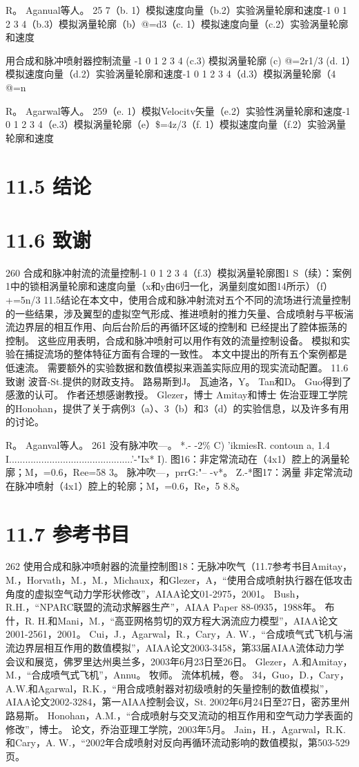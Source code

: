 \documentclass[UTF8,11pt,a4paper,openany,fontset=fandol]{ctexbook}
\begin{document}
R。 Aganual等人。 25 7（b. 1）模拟速度向量（b.2）实验涡量轮廓和速度-1 0 1 2 3 4（b.3）模拟涡量轮廓（b）@=d3（c. 1）模拟速度向量（c.2）实验涡量轮廓和速度

用合成和脉冲喷射器控制流量 -1 0 1 2 3 4 (c.3) 模拟涡量轮廓 (c) @=2r1/3 (d. 1）模拟速度向量（d.2）实验涡量轮廓和速度-1 0 1 2 3 4（d.3）模拟涡量轮廓（4 @=n

R。 Agarwal等人。 259（e. 1）模拟Velocitv矢量（e.2）实验性涡量轮廓和速度-1 0 1 2 3 4（e.3）模拟涡量轮廓（e）\$=4z/3（f. 1）模拟速度向量（f.2）实验涡量轮廓和速度

\section{11.5 结论}
\section{11.6 致谢}
260 合成和脉冲射流的流量控制-1 0 1 2 3 4（f.3）模拟涡量轮廓图1 S（续）：案例1中的锁相涡量轮廓和速度向量（x和y由6归一化，涡量刻度如图14所示）（f）+=5n/3 11.5结论在本文中，使用合成和脉冲射流对五个不同的流场进行流量控制的一些结果，涉及翼型的虚拟空气形成、推进喷射的推力矢量、合成喷射与平板湍流边界层的相互作用、向后台阶后的再循环区域的控制和 已经提出了腔体振荡的控制。 这些应用表明，合成和脉冲喷射可以用作有效的流量控制设备。 模拟和实验在捕捉流场的整体特征方面有合理的一致性。 本文中提出的所有五个案例都是低速流。 需要额外的实验数据和数值模拟来涵盖实际应用的现实流动配置。 11.6 致谢 波音-St.提供的财政支持。 路易斯到J。 瓦迪洛，Y。 Tan和D。 Guo得到了感激的认可。 作者还想感谢教授。 Glezer，博士 Amitay和博士 佐治亚理工学院的Honohan，提供了关于病例3（a）、3（b）和3（d）的实验信息，以及许多有用的讨论。

R。 Aganval等人。 261 没有脉冲吹---。 *.- -2\% C) 'ikmiesR. contoun a, 1.4 I..............................................'-"Ix* I). 图16：非定常流动在（4x1）腔上的涡量轮廓；M，=0.6，Ree=58 3。 脉冲吹---，prrG:"-- -v*。 Z.-*图17：涡量 非定常流动在脉冲喷射（4x1）腔上的轮廓；M，=0.6，Re，5 8.8。

\section{11.7 参考书目}
262 使用合成和脉冲喷射器的流量控制图18：无脉冲吹气（11.7参考书目Amitay，M.，Horvath，M.，M.，Michaux，和Glezer，A，“使用合成喷射执行器在低攻击角度的虚拟空气动力学形状修改”，AIAA论文01-2975，2001。 Bush，R.H.，“NPARC联盟的流动求解器生产”，AIAA Paper 88-0935，1988年。 布什，R. H.和Mani，M.，“高亚网格剪切的双方程大涡流应力模型”，AIAA论文2001-2561，2001。 Cui，J.，Agarwal，R.，Cary，A. W.，“合成喷气式飞机与湍流边界层相互作用的数值模拟”，AIAA论文2003-3458，第33届AIAA流体动力学会议和展览，佛罗里达州奥兰多，2003年6月23日至26日。 Glezer，A.和Amitay，M.，“合成喷气式飞机”，Annu。 牧师。 流体机械，卷。 34，Guo，D.，Cary，A.W.和Agarwal，R.K.，“用合成喷射器对初级喷射的矢量控制的数值模拟”，AIAA论文2002-3284，第一AIAA控制会议，St. 2002年6月24日至27日，密苏里州路易斯。 Honohan，A.M.，“合成喷射与交叉流动的相互作用和空气动力学表面的修改”，博士。 论文，乔治亚理工学院，2003年5月。 Jain，H.，Agarwal，R.K.和Cary，A. W.，“2002年合成喷射对反向再循环流动影响的数值模拟，第503-529页。
\end{document}
